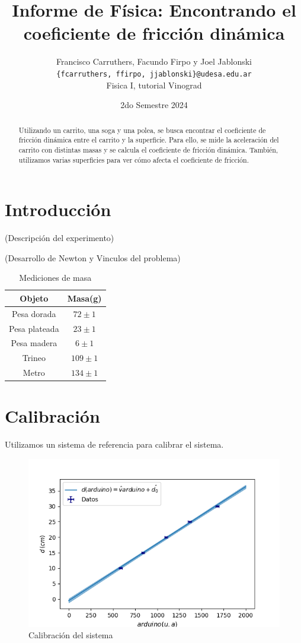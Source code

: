 \documentclass[12pt,a4]{article}
\title{Informe de Física: Encontrando el coeficiente de fricción dinámica}
\author{Francisco Carruthers, Facundo Firpo y Joel Jablonski\\ [2mm]
\small \texttt{\{fcarruthers, ffirpo, jjablonski\}@udesa.edu.ar}\\
\small Fisica I, tutorial Vinograd}
\date{2do Semestre 2024}
\begin{document}
\maketitle

\begin{abstract}
    Utilizando un carrito, una soga y una polea, se busca encontrar el coeficiente de fricción dinámica entre el carrito y la superficie. Para ello, se mide la aceleración del carrito con distintas masas y se calcula el coeficiente de fricción dinámica. También, utilizamos varias superficies para ver cómo afecta el coeficiente de fricción.
\end{abstract}

\section{Introducción}

(Descripción del experimento)

(Desarrollo de Newton y Vinculos del problema)

\begin{table}
    \centering
    \begin{tabular}{|c|c|}
        \hline
        \textbf{Objeto} & \textbf{Masa(g)} \\
        \hline
        Pesa dorada & $72 \pm 1$ \\
        Pesa plateada & $23 \pm 1$ \\
        Pesa madera & $6 \pm 1$ \\
        Trineo & $109 \pm 1$ \\
        Metro & $134 \pm 1$ \\
        \hline
    \end{tabular}
    \caption{Mediciones de masa}
    \label{tab:mediciones}
\end{table}

\newpage
\section{Calibración}

Utilizamos un sistema de referencia para calibrar el sistema.

\begin{figure}[H]
    \centering
    \includegraphics[width=0.9\linewidth]{Calibracion.png}
    \caption{Calibración del sistema}
    \label{fig:calibracion}
\end{figure}
\end{document}
